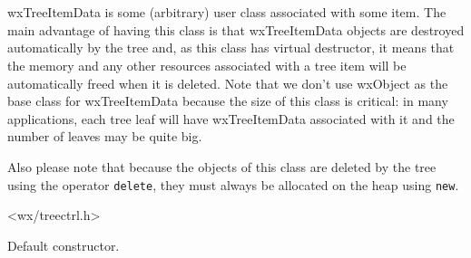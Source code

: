 \section{}\label{wxtreeitemdata}

wxTreeItemData is some (arbitrary) user class associated with some item. The
main advantage of having this class is that wxTreeItemData objects are
destroyed automatically by the tree and, as this class has virtual destructor,
it means that the memory and any other resources associated with a tree item
will be automatically freed when it is deleted. Note that we don't use wxObject
as the base class for wxTreeItemData because the size of this class is
critical: in many applications, each tree leaf will have wxTreeItemData
associated with it and the number of leaves may be quite big.

Also please note that because the objects of this class are deleted by the tree
using the operator {\tt delete}, they must always be allocated on the heap
using {\tt new}.




<wx/treectrl.h>




\label{wxtreeitemdatactor}


Default constructor.



